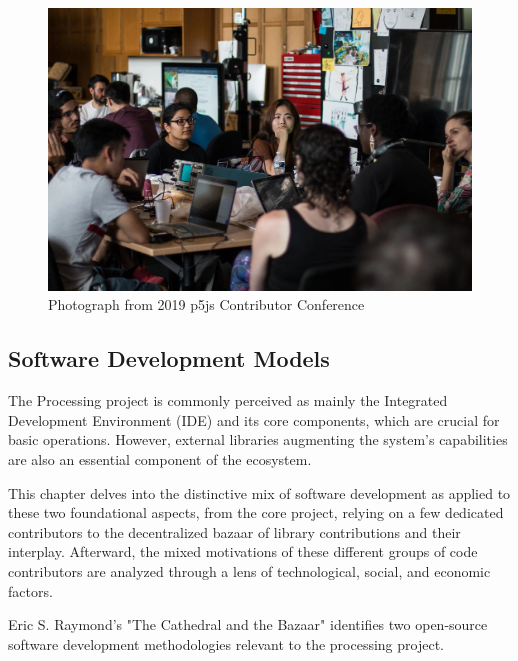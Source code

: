 
\begin{figure}
	\centering
	\includegraphics[width=\textwidth]{images/cathedral-or-bazaar.jpeg}
	\caption{Photograph from 2019 p5js Contributor Conference}
	\label{fig:p5ps-conference}
\end{figure}


\subsection{Software Development Models}

The Processing project is commonly perceived as mainly the Integrated Development Environment (IDE) and its core components, which are crucial for basic operations. However, external libraries augmenting the system's capabilities are also an essential component of the ecosystem.  

This chapter delves into the distinctive mix of software development as applied to these two foundational aspects, from the core project, relying on a few dedicated contributors to the decentralized bazaar of library contributions and their interplay. Afterward, the mixed motivations of these different groups of code contributors are analyzed through a lens of technological, social, and economic factors. 

Eric S. Raymond's "The Cathedral and the Bazaar" \parencite{raymondCathedralBazaar1999} identifies two open-source software development methodologies relevant to the processing project. 


